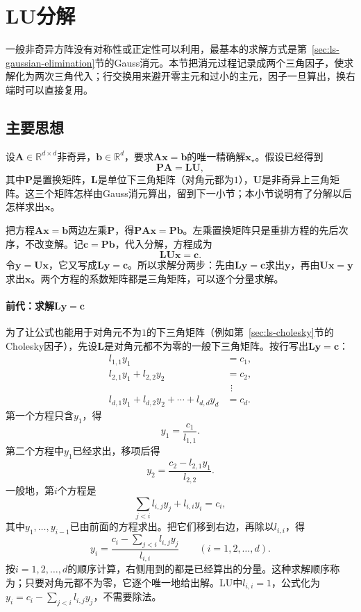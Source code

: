 \section{LU分解}
\label{sec:ls-lu}

一般非奇异方阵没有对称性或正定性可以利用，最基本的求解方式是第~\ref{sec:ls-gaussian-elimination}节的Gauss消元。本节把消元过程记录成两个三角因子，使求解化为两次三角代入；行交换用来避开零主元和过小的主元，因子一旦算出，换右端时可以直接复用。

\subsection{主要思想}
设$\bm A\in\mathbb R^{d\times d}$非奇异，$\bm b\in\mathbb R^d$，要求$\bm A\bm x=\bm b$的唯一精确解$\bm x_\star$。假设已经得到
\begin{equation}
 \bm P\bm A=\bm L\bm U,
 \label{eq:ls-palu}
\end{equation}
其中$\bm P$是置换矩阵，$\bm L$是单位下三角矩阵（对角元都为$1$），$\bm U$是非奇异上三角矩阵。这三个矩阵怎样由Gauss消元算出，留到下一小节；本小节说明有了分解以后怎样求出$\bm x$。

把方程$\bm A\bm x=\bm b$两边左乘$\bm P$，得$\bm P\bm A\bm x=\bm P\bm b$。左乘置换矩阵只是重排方程的先后次序，不改变解。记$\bm c=\bm P\bm b$，代入分解，方程成为
\[
 \bm L\bm U\bm x=\bm c .
\]
令$\bm y=\bm U\bm x$，它又写成$\bm L\bm y=\bm c$。所以求解分两步：先由$\bm L\bm y=\bm c$求出$\bm y$，再由$\bm U\bm x=\bm y$求出$\bm x$。两个方程的系数矩阵都是三角矩阵，可以逐个分量求解。

\paragraph{前代：求解$\bm L\bm y=\bm c$}
为了让公式也能用于对角元不为$1$的下三角矩阵（例如第~\ref{sec:ls-cholesky}节的Cholesky因子），先设$\bm L$是对角元都不为零的一般下三角矩阵。按行写出$\bm L\bm y=\bm c$：
\[
 \begin{aligned}
 l_{1,1}y_1&=c_1,\\
 l_{2,1}y_1+l_{2,2}y_2&=c_2,\\
 &\ \,\vdots\\
 l_{d,1}y_1+l_{d,2}y_2+\cdots+l_{d,d}y_d&=c_d .
 \end{aligned}
\]
第一个方程只含$y_1$，得
\[
 y_1=\frac{c_1}{l_{1,1}} .
\]
第二个方程中$y_1$已经求出，移项后得
\[
 y_2=\frac{c_2-l_{2,1}y_1}{l_{2,2}} .
\]
一般地，第$i$个方程是
\[
 \sum_{j<i}l_{i,j}y_j+l_{i,i}y_i=c_i ,
\]
其中$y_1,\ldots,y_{i-1}$已由前面的方程求出。把它们移到右边，再除以$l_{i,i}$，得
\begin{equation}
 y_i=\frac{c_i-\sum_{j<i}l_{i,j}y_j}{l_{i,i}}\qquad(i=1,2,\ldots,d).
 \label{eq:ls-forward-substitution}
\end{equation}
按$i=1,2,\ldots,d$的顺序计算，右侧用到的都是已经算出的分量。这种求解顺序称为；只要对角元都不为零，它逐个唯一地给出解。LU中$l_{i,i}=1$，公式化为$y_i=c_i-\sum_{j<i}l_{i,j}y_j$，不需要除法。

